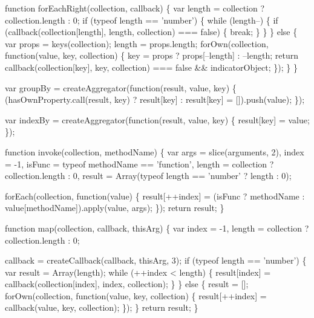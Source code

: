 \begin{DoxyCodeInclude}
{{  \textcolor{keyword}{function} forEachRight(collection, callback) \{
    var length = collection ? collection.length : 0;
    \textcolor{keywordflow}{if} (typeof length == \textcolor{stringliteral}{'number'}) \{
      \textcolor{keywordflow}{while} (length--) \{
        \textcolor{keywordflow}{if} (callback(collection[length], length, collection) === \textcolor{keyword}{false}) \{
          \textcolor{keywordflow}{break};
        \}
      \}
    \} \textcolor{keywordflow}{else} \{
      var props = keys(collection);
      length = props.length;
      forOwn(collection, \textcolor{keyword}{function}(value, key, collection) \{
        key = props ? props[--length] : --length;
        \textcolor{keywordflow}{return} callback(collection[key], key, collection) === \textcolor{keyword}{false} && indicatorObject;
      \});
    \}
  \}

  var groupBy = createAggregator(\textcolor{keyword}{function}(result, value, key) \{
    (hasOwnProperty.call(result, key) ? result[key] : result[key] = []).push(value);
  \});

  var indexBy = createAggregator(\textcolor{keyword}{function}(result, value, key) \{
    result[key] = value;
  \});

  \textcolor{keyword}{function} invoke(collection, methodName) \{
    var args = slice(arguments, 2),
        index = -1,
        isFunc = typeof methodName == \textcolor{stringliteral}{'function'},
        length = collection ? collection.length : 0,
        result = Array(typeof length == \textcolor{stringliteral}{'number'} ? length : 0);

    forEach(collection, \textcolor{keyword}{function}(value) \{
      result[++index] = (isFunc ? methodName : value[methodName]).apply(value, args);
    \});
    \textcolor{keywordflow}{return} result;
  \}

  \textcolor{keyword}{function} map(collection, callback, thisArg) \{
    var index = -1,
        length = collection ? collection.length : 0;

    callback = createCallback(callback, thisArg, 3);
    \textcolor{keywordflow}{if} (typeof length == \textcolor{stringliteral}{'number'}) \{
      var result = Array(length);
      \textcolor{keywordflow}{while} (++index < length) \{
        result[index] = callback(collection[index], index, collection);
      \}
    \} \textcolor{keywordflow}{else} \{
      result = [];
      forOwn(collection, \textcolor{keyword}{function}(value, key, collection) \{
        result[++index] = callback(value, key, collection);
      \});
    \}
    \textcolor{keywordflow}{return} result;
  \}

}}
\end{DoxyCodeInclude}
